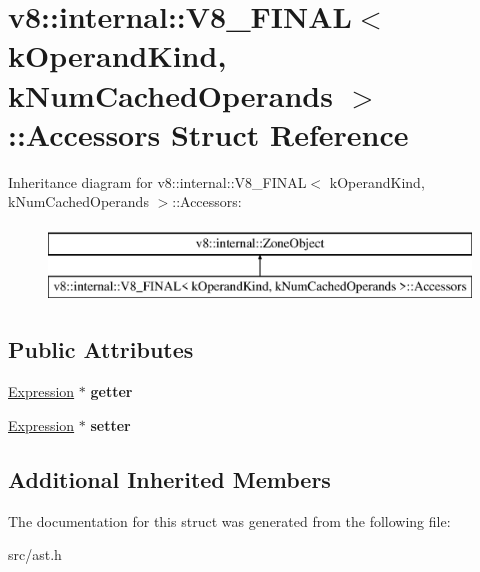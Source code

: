 \hypertarget{structv8_1_1internal_1_1_v8___f_i_n_a_l_1_1_accessors}{}\section{v8\+:\+:internal\+:\+:V8\+\_\+\+F\+I\+N\+A\+L$<$ k\+Operand\+Kind, k\+Num\+Cached\+Operands $>$\+:\+:Accessors Struct Reference}
\label{structv8_1_1internal_1_1_v8___f_i_n_a_l_1_1_accessors}
Inheritance diagram for v8\+:\+:internal\+:\+:V8\+\_\+\+F\+I\+N\+A\+L$<$ k\+Operand\+Kind, k\+Num\+Cached\+Operands $>$\+:\+:Accessors\+:\begin{figure}[H]
\begin{center}
\leavevmode
\includegraphics[height=2.000000cm]{structv8_1_1internal_1_1_v8___f_i_n_a_l_1_1_accessors}
\end{center}
\end{figure}
\subsection*{Public Attributes}
\begin{DoxyCompactItemize}
\item 
\hypertarget{structv8_1_1internal_1_1_v8___f_i_n_a_l_1_1_accessors_a3c057b76e7fe2d13f1a55fae47dbdfd2}{}\hyperlink{classv8_1_1internal_1_1_expression}{Expression} $\ast$ {\bfseries getter}\label{structv8_1_1internal_1_1_v8___f_i_n_a_l_1_1_accessors_a3c057b76e7fe2d13f1a55fae47dbdfd2}

\item 
\hypertarget{structv8_1_1internal_1_1_v8___f_i_n_a_l_1_1_accessors_a0c0dec1b16e90df419e5762dfe419ade}{}\hyperlink{classv8_1_1internal_1_1_expression}{Expression} $\ast$ {\bfseries setter}\label{structv8_1_1internal_1_1_v8___f_i_n_a_l_1_1_accessors_a0c0dec1b16e90df419e5762dfe419ade}

\end{DoxyCompactItemize}
\subsection*{Additional Inherited Members}


The documentation for this struct was generated from the following file\+:\begin{DoxyCompactItemize}
\item 
src/ast.\+h\end{DoxyCompactItemize}
